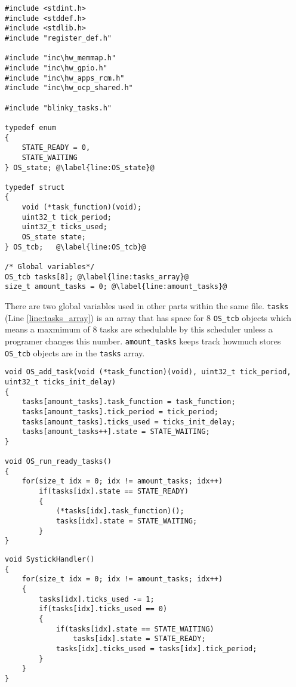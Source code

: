 \begin{lstlisting}[style=CStyle, caption={Definition code where a state datatype and housekeeping datatype for tasks is made}, captionpos=b, label={lst:def_scheduler}, escapechar=@]
#include <stdint.h>
#include <stddef.h>
#include <stdlib.h>
#include "register_def.h"

#include "inc\hw_memmap.h"
#include "inc\hw_gpio.h"
#include "inc\hw_apps_rcm.h"
#include "inc\hw_ocp_shared.h"

#include "blinky_tasks.h"

typedef enum
{
    STATE_READY = 0,
    STATE_WAITING
} OS_state; @\label{line:OS_state}@

typedef struct
{
    void (*task_function)(void);
    uint32_t tick_period;
    uint32_t ticks_used;
    OS_state state;
} OS_tcb;   @\label{line:OS_tcb}@

/* Global variables*/
OS_tcb tasks[8]; @\label{line:tasks_array}@
size_t amount_tasks = 0; @\label{line:amount_tasks}@
\end{lstlisting}

There are two global variables used in other parts within the same file.
\texttt{tasks} (Line \ref{line:tasks_array}) is an array that has space for 8 \texttt{OS\_tcb} objects which means a maxmimum of 8 tasks are schedulable by this scheduler unless a programer changes this number.
\texttt{amount\_tasks} keeps track howmuch stores \texttt{OS\_tcb} objects are in the \texttt{tasks} array.

\begin{lstlisting}[style=CStyle, caption={Task controllers}, captionpos=b, label={lst:task_control_functions}, escapechar=@]
void OS_add_task(void (*task_function)(void), uint32_t tick_period, uint32_t ticks_init_delay)
{
    tasks[amount_tasks].task_function = task_function;
    tasks[amount_tasks].tick_period = tick_period;
    tasks[amount_tasks].ticks_used = ticks_init_delay;
    tasks[amount_tasks++].state = STATE_WAITING;
}

void OS_run_ready_tasks()
{
    for(size_t idx = 0; idx != amount_tasks; idx++)
        if(tasks[idx].state == STATE_READY)
        {
            (*tasks[idx].task_function)();
            tasks[idx].state = STATE_WAITING;
        }
}
\end{lstlisting}

\begin{lstlisting}[style=CStyle, caption={Scheduler SysTick}, captionpos=b, label={lst:scheduler_systick}, escapechar=@]
void SystickHandler()
{
    for(size_t idx = 0; idx != amount_tasks; idx++)
    {
        tasks[idx].ticks_used -= 1;
        if(tasks[idx].ticks_used == 0)
        {
            if(tasks[idx].state == STATE_WAITING)
                tasks[idx].state = STATE_READY;
            tasks[idx].ticks_used = tasks[idx].tick_period;
        }
    }
}
\end{lstlisting}

